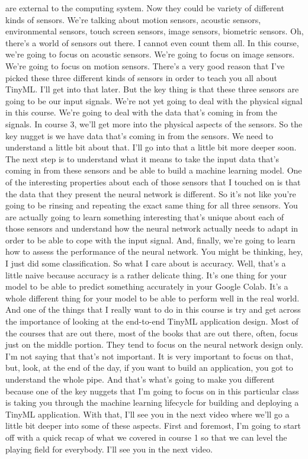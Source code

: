 are external to the computing system.
Now they could be variety of different kinds of sensors.
We're talking about motion sensors, acoustic sensors,
environmental sensors, touch screen sensors, image sensors,
biometric sensors.
Oh, there's a world of sensors out there.
I cannot even count them all.
In this course, we're going to focus on acoustic sensors.
We're going to focus on image sensors.
We're going to focus on motion sensors.
There's a very good reason that I've picked
these three different kinds of sensors in order to teach you all about TinyML.
I'll get into that later.
But the key thing is that these three sensors
are going to be our input signals.
We're not yet going to deal with the physical signal in this course.
We're going to deal with the data that's coming in from the signals.
In course 3, we'll get more into the physical aspects of the sensors.
So the key nugget is we have data that's coming in from the sensors.
We need to understand a little bit about that.
I'll go into that a little bit more deeper soon.
The next step is to understand what it means
to take the input data that's coming in from these sensors
and be able to build a machine learning model.
One of the interesting properties about each of those sensors that I touched on
is that the data that they present the neural network is different.
So it's not like you're going to be rinsing and repeating
the exact same thing for all three sensors.
You are actually going to learn something interesting
that's unique about each of those sensors
and understand how the neural network actually
needs to adapt in order to be able to cope with the input signal.
And, finally, we're going to learn how to assess
the performance of the neural network.
You might be thinking, hey, I just did some classification.
So what I care about is accuracy.
Well, that's a little naive because accuracy is a rather delicate thing.
It's one thing for your model to be able to predict something accurately
in your Google Colab.
It's a whole different thing for your model
to be able to perform well in the real world.
And one of the things that I really want to do in this course
is try and get across the importance of looking at the end-to-end TinyML
application design.
Most of the courses that are out there, most of the books that are out there,
often, focus just on the middle portion.
They tend to focus on the neural network design only.
I'm not saying that that's not important.
It is very important to focus on that, but, look, at the end of the day,
if you want to build an application, you
got to understand the whole pipe.
And that's what's going to make you different
because one of the key nuggets that I'm going to focus on
in this particular class is taking you through the machine learning lifecycle
for building and deploying a TinyML application.
With that, I'll see you in the next video
where we'll go a little bit deeper into some of these aspects.
First and foremost, I'm going to start off
with a quick recap of what we covered in course 1
so that we can level the playing field for everybody.
I'll see you in the next video.

